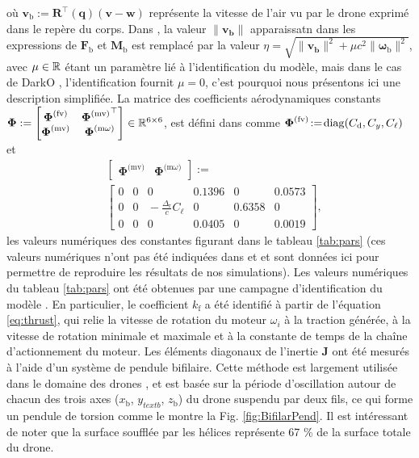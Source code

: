 où $\boldsymbol{v}_{\text{b}} := \boldsymbol{R}^\top(\boldsymbol{q}) (\boldsymbol{v}-\boldsymbol{w})$ représente la vitesse de l'air vu par le drone exprimé dans le repère du corps. Dans \cite{lustosa:hal-03035938}, la valeur $\lVert \boldsymbol{v_{\text{b}}} \rVert$ apparaissatn dans les expressions de  $\boldsymbol{F}_{\text{b}}$ et $\boldsymbol{M}_{\text{b}}$ est remplacé par la valeur $\eta = \sqrt{\lVert \boldsymbol{v_{\text{b}}} \rVert^{2} + \mu c^{2} \lVert \boldsymbol{\omega}_{\text{b}} \rVert^{2}}$, avec $\mu \in {\mathbb R}$ étant un paramètre lié à l'identification du modèle, mais dans le cas de DarkO \cite{sansou:stage}, l'identification fournit $\mu = 0$, c'est pourquoi nous présentons ici une description simplifiée. La matrice des coefficients aérodynamiques constants 
$\boldsymbol{\Phi}:= \begin{bmatrix} \boldsymbol{\Phi}^{\text{(fv)}} & {\boldsymbol{\Phi}^{\text{(mv)}}}^\top \\ \boldsymbol{\Phi}^{\text{(mv)}} & \boldsymbol{\Phi}^{\text{(m$\omega$)}} \end{bmatrix} \in {\mathbb R}^{6 \times 6}$, est défini dans \cite[eqs. (6)--(9)]{olszaneckibarth:hal-02542982} comme $ \boldsymbol{\Phi}^{\text{(fv)}} \!:=\! \operatorname{diag}(C_{\text{d}},C_{y}, C_{\ell})$ et
\begin{align*}
&\left[ \begin{array}{c|c}
    \boldsymbol{\Phi}^{\text{(mv)}}  &  \boldsymbol{\Phi}^{\text{(m$\omega$)}} 
\end{array}\right] :=\\ 
&\left[ \begin{array}{ccc|ccc}
    0 & 0 & 0    &                                          0.1396 & 0 & 0.0573 \\
    0 & 0 & \!\!\!\!\! -\frac{\Delta_{\text{r}}}{c}C_{\ell} &    0 &  0.6358  & 0 \\
    0 & 0 & 0 &     0.0405 & 0 & 0.0019 
\end{array}\right],
\end{align*}
les valeurs numériques des constantes figurant dans le tableau \ref{tab:pars} (ces valeurs numériques n'ont pas été indiquées dans \cite{lustosa:hal-03035938} et \cite{olszaneckibarth:hal-02542982} et sont données ici pour permettre de reproduire les résultats de nos simulations). Les valeurs numériques du tableau \ref{tab:pars} ont été obtenues par une campagne d'identification du modèle \cite{sansou:stage}. En particulier, le coefficient $k_{\text{f}}$ a été identifié à partir de l'équation \eqref{eq:thrust}, qui relie la vitesse de rotation du moteur $\omega_{i}$ à la traction générée, à la vitesse de rotation minimale et maximale et à la constante de temps de la chaîne d'actionnement du moteur. Les éléments diagonaux de l'inertie $\boldsymbol{J}$ ont été mesurés à l'aide d'un système de pendule bifilaire. Cette méthode est largement utilisée dans le domaine des drones \cite{Jardin2007OptimizedMO}, et est basée sur la période d'oscillation autour de chacun des trois axes ($x_{{\text{b}}}$, $y_{text{b}}$, $z_{\text{b}}$) du drone suspendu par deux fils, ce qui forme un pendule de torsion comme le montre la Fig. \ref{fig:BifilarPend}.
Il est intéressant de noter que la surface soufflée par les hélices représente 67 \% de la surface totale du drone.


